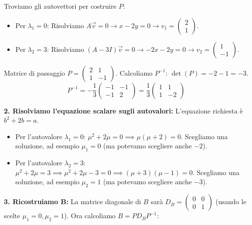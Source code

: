 \documentclass[10pt,a4paper]{article}
\begin{document}
Troviamo gli autovettori per costruire $P$:
\begin{itemize}
    \item Per $\lambda_1 = 0$: Risolviamo $A\vec{v} = 0 \to x - 2y = 0 \to v_1 = \begin{pmatrix} 2 \\ 1 \end{pmatrix}$.
    \item Per $\lambda_2 = 3$: Risolviamo $(A-3I)\vec{v} = 0 \to -2x - 2y = 0 \to v_2 = \begin{pmatrix} 1 \\ -1 \end{pmatrix}$.
\end{itemize}
Matrice di passaggio $P = \begin{pmatrix} 2 & 1 \\ 1 & -1 \end{pmatrix}$. Calcoliamo $P^{-1}$:
$\det(P) = -2 - 1 = -3$.
\[ P^{-1} = -\frac{1}{3} \begin{pmatrix} -1 & -1 \\ -1 & 2 \end{pmatrix} = \frac{1}{3} \begin{pmatrix} 1 & 1 \\ 1 & -2 \end{pmatrix} \]

\textbf{2. Risolviamo l'equazione scalare sugli autovalori:}
L'equazione richiesta è $b^2 + 2b = a$.
\begin{itemize}
    \item Per l'autovalore $\lambda_1 = 0$:
    $\mu^2 + 2\mu = 0 \implies \mu(\mu+2)=0$.
    Scegliamo una soluzione, ad esempio $\mu_1 = 0$ (ma potevamo scegliere anche $-2$).
    
    \item Per l'autovalore $\lambda_2 = 3$:
    $\mu^2 + 2\mu = 3 \implies \mu^2 + 2\mu - 3 = 0 \implies (\mu+3)(\mu-1)=0$.
    Scegliamo una soluzione, ad esempio $\mu_2 = 1$ (ma potevamo scegliere anche $-3$).
\end{itemize}

\textbf{3. Ricostruiamo B:}
La matrice diagonale di $B$ sarà $D_B = \begin{pmatrix} 0 & 0 \\ 0 & 1 \end{pmatrix}$ (usando le scelte $\mu_1=0, \mu_2=1$).
Ora calcoliamo $B = P D_B P^{-1}$:
\end{document}

